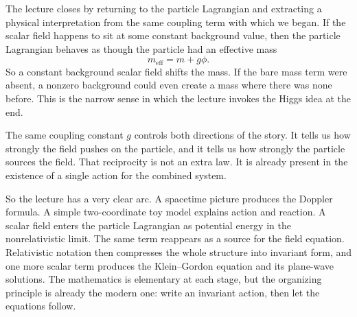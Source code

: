 The lecture closes by returning to the particle Lagrangian and extracting a physical interpretation from the same coupling term with which we began. If the scalar field happens to sit at some constant background value, then the particle Lagrangian behaves as though the particle had an effective mass
\begin{equation}
m_{\mathrm{eff}}=m+g\phi.
\end{equation}
So a constant background scalar field shifts the mass. If the bare mass term were absent, a nonzero background could even create a mass where there was none before. This is the narrow sense in which the lecture invokes the Higgs idea at the end.

The same coupling constant \(g\) controls both directions of the story. It tells us how strongly the field pushes on the particle, and it tells us how strongly the particle sources the field. That reciprocity is not an extra law. It is already present in the existence of a single action for the combined system.

So the lecture has a very clear arc. A spacetime picture produces the Doppler formula. A simple two-coordinate toy model explains action and reaction. A scalar field enters the particle Lagrangian as potential energy in the nonrelativistic limit. The same term reappears as a source for the field equation. Relativistic notation then compresses the whole structure into invariant form, and one more scalar term produces the Klein--Gordon equation and its plane-wave solutions. The mathematics is elementary at each stage, but the organizing principle is already the modern one: write an invariant action, then let the equations follow.